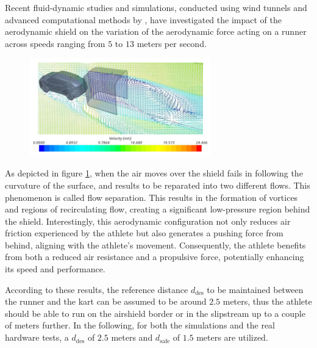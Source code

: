 \documentclass[a4paper,12pt,oneside]{book}
\begin{document}
\bigskip
Recent fluid-dynamic studies and simulations, conducted using wind tunnels and advanced computational methods by \cite{Coni_article}, have investigated the impact of the aerodynamic shield on the variation of the aerodynamic force acting on a runner across speeds ranging from $5$ to $13$ meters per second.

\begin{figure}[h!]
	\centering
	\includegraphics[width=0.7\textwidth]{Aerodynamics.png}
	\caption{}
	\label{image:Aerodynamic_studies}
\end{figure}

As depicted in figure \ref{image:Aerodynamic_studies}, when the air moves over the shield fails in following the curvature of the surface, and results to be reparated into two different flows.
This phenomenon is called flow separation.
This results in the formation of vortices and regions of recirculating flow, creating a significant low-pressure region behind the shield.
Interestingly, this aerodynamic configuration not only reduces air friction experienced by the athlete but also generates a pushing force from behind, aligning with the athlete's movement. 
Consequently, the athlete benefits from both a reduced air resistance and a propulsive force, potentially enhancing its speed and performance.

\bigskip
According to these results, the reference distance $d_{\text{des}}$ to be maintained between the runner and the kart can be assumed to be around $2.5$ meters, thus the athlete should be able to run on the airshield border or in the slipstream up to a couple of meters further.
In the following, for both the simulations and the real hardware tests, a $d_\text{des}$ of $2.5$ meters and $d_\text{safe}$ of $1.5$ meters are utilized.
\end{document}
